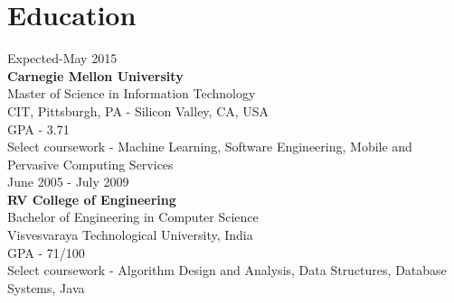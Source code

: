 \documentclass{tccv}
\begin{document}
\section{Education}

{\hfill\sc Expected-May 2015}\\
\textbf{Carnegie Mellon University}\\ 
Master of Science in Information Technology\\
CIT, Pittsburgh, PA - Silicon Valley, CA, USA\\
GPA - 3.71\\
Select coursework - Machine Learning, Software Engineering, Mobile and Pervasive Computing Services\\

{\hfill\sc June 2005 - July 2009}\\
\textbf{RV College of Engineering}\\
Bachelor of Engineering in Computer Science\\
Visvesvaraya Technological University, India\\
GPA - 71/100\\
Select coursework - Algorithm Design and Analysis, Data Structures, Database Systems, Java\\ 
\end{document}
